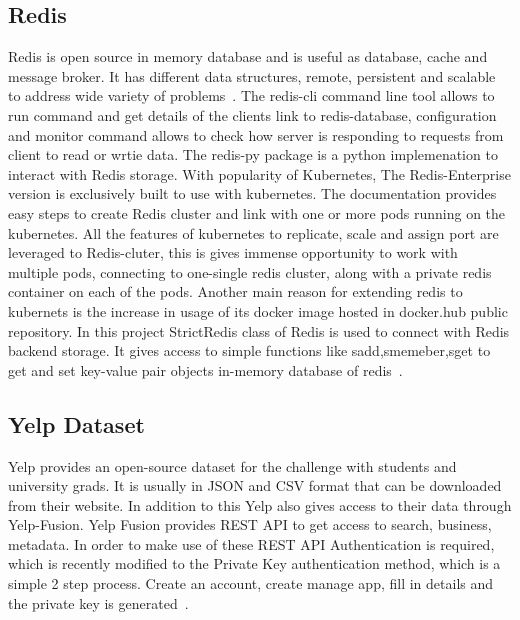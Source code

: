 \subsection{Redis}

Redis is open source in memory database and is useful as database,
cache and message broker. It has different data structures, remote,
persistent and scalable to address wide variety of
problems~\cite{hid-sp18-602-redis}. The redis-cli command line tool
allows to run command and get details of the clients link to
redis-database, configuration and monitor command allows to check how
server is responding to requests from client to read or wrtie
data. The redis-py package is a python implemenation to interact with
Redis storage. With popularity of Kubernetes, The Redis-Enterprise
version is exclusively built to use with kubernetes. The documentation
provides easy steps to create Redis cluster and link with one or more
pods running on the kubernetes. All the features of kubernetes to
replicate, scale and assign port are leveraged to Redis-cluter, this
is gives immense opportunity to work with multiple pods, connecting to
one-single redis cluster, along with a private redis container on each
of the pods. Another main reason for extending redis to kubernets is
the increase in usage of its docker image hosted in docker.hub public
repository. In this project StrictRedis class of Redis is used to
connect with Redis backend storage. It gives access to simple
functions like sadd,smemeber,sget to get and set key-value pair
objects in-memory database of redis~\cite{hid-sp18-602-redis}.

\subsection{Yelp Dataset}

Yelp provides an open-source dataset for the challenge with students
and university grads. It is usually in JSON and CSV format that can be
downloaded from their website. In addition to this Yelp also gives
access to their data through Yelp-Fusion. Yelp Fusion provides REST
API to get access to search, business, metadata. In order to make use
of these REST API Authentication is required, which is recently
modified to the Private Key authentication method, which is a simple 2
step process. Create an account, create manage app, fill in details
and the private key is generated~\cite{hid-sp18-602-yelp}.


